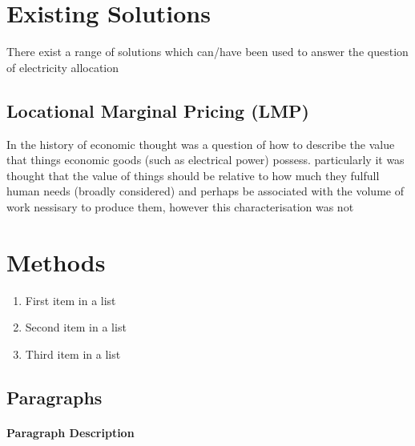 \documentclass[
10pt, %
a4paper, %
oneside, %
headinclude,footinclude, %
BCOR5mm, %
]{scrartcl}
\begin{document}
\section{Existing Solutions}

There exist a range of solutions which can/have been used to answer the question of electricity allocation

\subsection{Locational Marginal Pricing (LMP)}

In the history of economic thought was a question of how to describe the value that things economic goods (such as electrical power) possess. particularly it was thought that the value of things should be relative to how much they fulfull human needs (broadly considered) and perhaps be associated with the volume of work nessisary to produce them, however this characterisation was not 




\section{Methods}

\lipsum[5] %

\begin{enumerate}[noitemsep] %
\item First item in a list
\item Second item in a list
\item Third item in a list
\end{enumerate}


\subsection{Paragraphs}

\lipsum[6] %

\paragraph{Paragraph Description} \lipsum[7] %
\end{document}
